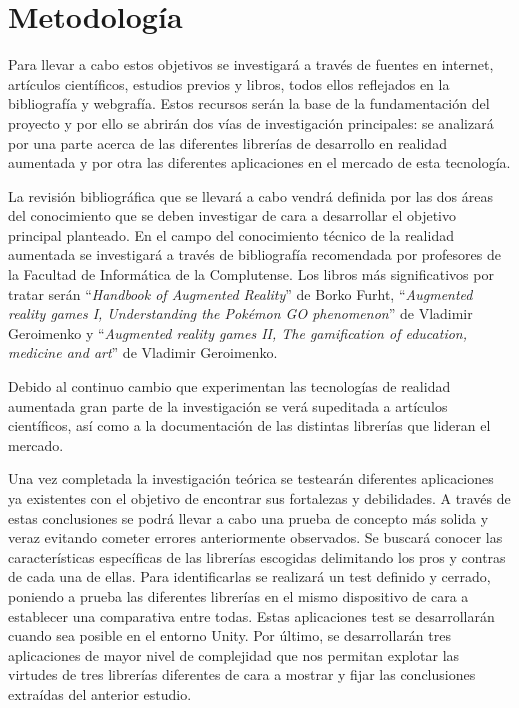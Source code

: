 \section{Metodología}
Para llevar a cabo estos objetivos se investigará a través de fuentes en internet, artículos científicos, estudios previos y libros, todos ellos reflejados en la bibliografía y webgrafía. Estos recursos serán la base de la fundamentación del proyecto y por ello se abrirán dos vías de investigación principales: se analizará por una parte acerca de las diferentes librerías de desarrollo en realidad aumentada y por otra las diferentes aplicaciones en el mercado de esta tecnología.\vspace{\baselineskip}

La revisión bibliográfica que se llevará a cabo vendrá definida por las dos áreas del conocimiento que se deben investigar de cara a desarrollar el objetivo principal planteado. En el campo del conocimiento técnico de la realidad aumentada se investigará a través de bibliografía recomendada por profesores de la Facultad de Informática de la Complutense. Los libros más significativos por tratar serán “\textit{Handbook of Augmented Reality}” de Borko Furht, “\textit{Augmented reality games I, Understanding the Pokémon GO phenomenon}” de Vladimir Geroimenko y “\textit{Augmented reality games II, The gamification of education, medicine and art}” de Vladimir Geroimenko.\vspace{\baselineskip}

Debido al continuo cambio que experimentan las tecnologías de realidad aumentada gran parte de la investigación se verá supeditada a artículos científicos, así como a la documentación de las distintas librerías que lideran el mercado.\vspace{\baselineskip}

Una vez completada la investigación teórica se testearán diferentes aplicaciones ya existentes con el objetivo de encontrar sus fortalezas y debilidades. A través de estas conclusiones se podrá llevar a cabo una prueba de concepto más solida y veraz evitando cometer errores anteriormente observados.\vspace{\baselineskip}
Se buscará conocer las características específicas de las librerías escogidas delimitando los pros y contras de cada una de ellas. Para identificarlas se realizará un test definido y cerrado, poniendo a prueba las diferentes librerías en el mismo dispositivo de cara a establecer una comparativa entre todas. Estas aplicaciones test se desarrollarán cuando sea posible en el entorno Unity.\vspace{\baselineskip}
Por último, se desarrollarán tres aplicaciones de mayor nivel de complejidad que nos permitan explotar las virtudes de tres librerías diferentes de cara a mostrar y fijar las conclusiones extraídas del anterior estudio.\vspace{\baselineskip}

